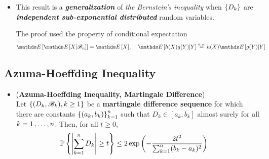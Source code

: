 \documentclass[11pt]{article}
\begin{document}
\begin{itemize}
\begin{proof}
\begin{align*}
\E{}{\exp\set{\lambda \paren{\sum_{k=1}^{n}D_k }}} &= \E{}{\exp\set{\lambda \paren{\sum_{k=1}^{n-1}D_k }} \E{}{\exp\set{\lambda D_n }  \;\Big|\; \srB_{n-1}}} \\
&\le \E{}{\exp\set{\lambda \paren{\sum_{k=1}^{n-1}D_k }}}\exp\paren{\frac{\lambda^2 \nu_k^2}{2} },
\end{align*} where the inequality follows from the stated assumption on $D_n$. Iterating this procedure yields the bound
$\E{}{\exp\set{\lambda \paren{\sum_{k=1}^{n}D_k}}} \le \exp\paren{\frac{\lambda^2\sum_{k=1}^{n}\nu_k^2}{2} }$, valid for all $\abs{\lambda} < 1/\alpha_{*}$. By definition, we conclude that $\sum_{k=1}^{n}D_k$ is \emph{sub-exponential} with \emph{parameters} $\paren{\sqrt{\sum_{k=1}^{n}\nu_k^2}\;  , \;\alpha_{*}}$, as claimed. The tail bound \eqref{ineqn: bernstein_inequality_martingale} follows by properties of sub-exponential distribution. \qed
\end{proof}

\item \begin{remark}
This result is a \emph{\textbf{generalization}} of \emph{the Bernstein's inequality} when $\left\{D_k\right\}$ are \emph{\textbf{independent sub-exponential distributed}} random variables. 

The proof used the property of conditional expectation 
\begin{align*}
\E{}{\E{}{X|\srB_{n}}} &= \E{}{X}, \quad \E{}{h(X) g(Y) | Y} \stackrel{a.s.}{=} h(X)\E{}{g(Y) | Y}
\end{align*}
\end{remark}
\end{itemize}
\subsection{Azuma-Hoeffding Inequality}
\begin{itemize}
\item \begin{corollary} (\textbf{Azuma-Hoeffding Inequality, Martingale Difference})\citep{wainwright2019high}\\
Let $\left\{(D_k, {\mathscr B}_k), k \ge 1\right\}$ be a \textbf{martingale difference sequence} for which there are constants $\left\{(a_k, b_k)\right\}^{n}_{k=1}$ such that $D_k \in [a_k, b_k]$ almost surely for all $k = 1 \,{,}\ldots{,}\, n$. Then, for all $t \ge 0$,
\begin{align}
{\mathbb P}\left\{\left\lvert \sum_{k=1}^{n}D_k \right\rvert \ge t \right\} &\le  2 \exp\left(- \frac{2 t^2}{ \sum_{k=1}^{n}(b_k - a_k)^2}\right) \label{ineqn: hoeffding_inequality_martingale}
\end{align}
\end{corollary}
\end{itemize}
\end{document}
